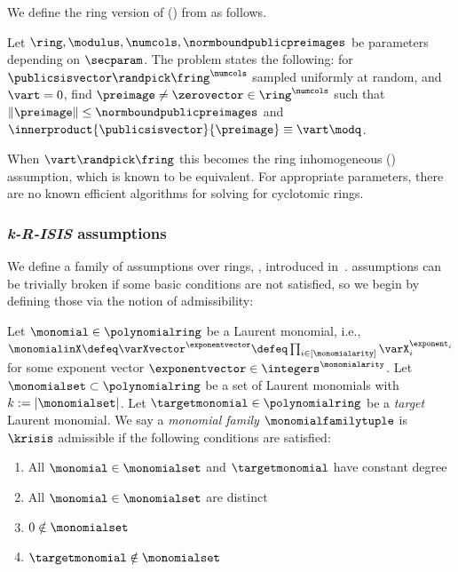 We define the ring version of \sis (\rsis) from \cite{Mic07} as follows.
\begin{definition} \label{def:rsis}
Let $\ring, \modulus, \numcols, \normboundpublicpreimages$ be parameters depending on $\secparam$.  The \rsis problem states the following: for $\publicsisvector \randpick \fring^{\numcols}$ sampled uniformly at random, and $\vart = 0$, find $\preimage \neq \zerovector \in \ring^\numcols$ such that $\norm{\preimage} \leq \normboundpublicpreimages$ and $\innerproduct{\publicsisvector}{\preimage} \equiv \vart \modq$.
\end{definition}

When $\vart \randpick \fring$ this becomes the ring inhomogeneous \sis (\risis) assumption, which is known to be equivalent. For appropriate parameters, there are no known efficient algorithms for solving \rsis for cyclotomic rings. 

\subsubsection{\textit{k-R-ISIS} assumptions}
\label{sec:kmisis}

We define a family of assumptions over rings, \krisis, introduced in~\cite{C:ACLMT22}. \krisis assumptions can be trivially broken if some basic conditions are not satisfied, so we begin by defining those via the notion of \krisis admissibility:

\begin{definition} \label{def:admissible}
Let $\monomial \in \polynomialring$ be a Laurent monomial, i.e., $\monomialinX \defeq \varXvector^{\exponentvector} \defeq \prod_{i \in [\monomialarity]} \varX_{i}^{\exponent_{i}}$ for some exponent vector $\exponentvector \in \integers^{\monomialarity}$. Let $\monomialset \subset \polynomialring$ be a set of Laurent monomials with $k := |\monomialset|$. Let $\targetmonomial \in \polynomialring$ be a \emph{target} Laurent monomial. We say a \emph{monomial family} $\monomialfamilytuple$ is \textsf{$\krisis$ admissible} if the following conditions are satisfied:
\begin{enumerate}[nosep]
        \item All $\monomial \in \monomialset$ and $\targetmonomial$ have constant degree
        \item All $\monomial \in \monomialset$ are distinct
        \item $0 \notin \monomialset$
        \item $\targetmonomial \notin \monomialset$
\end{enumerate}
\end{definition}


